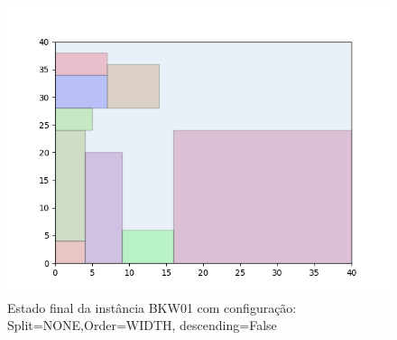 \begin{figure}[H]
    \centering
    \caption[]{Estado final da instância BKW01 com configuração: Split=NONE,Order=WIDTH, descending=False}
    \label{fig:bkw01-none-width-false}
    \includegraphics[scale=0.5]{output/figures/bkw/bkw01/none/width/false/00}
\end{figure}